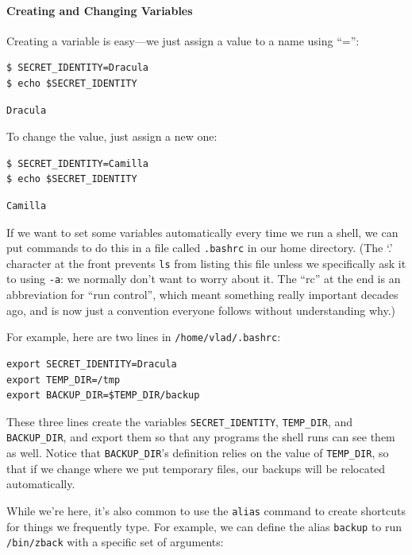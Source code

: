 \documentclass{book}
\begin{document}
\mbox{}\paragraph{Creating and Changing Variables}

Creating a variable is easy---we just assign a value to a name using
``='':

\begin{verbatim}
$ SECRET_IDENTITY=Dracula
$ echo $SECRET_IDENTITY
\end{verbatim}

\begin{verbatim}
Dracula
\end{verbatim}

To change the value, just assign a new one:

\begin{verbatim}
$ SECRET_IDENTITY=Camilla
$ echo $SECRET_IDENTITY
\end{verbatim}

\begin{verbatim}
Camilla
\end{verbatim}

If we want to set some variables automatically every time we run a
shell, we can put commands to do this in a file called \texttt{.bashrc}
in our home directory. (The `.' character at the front prevents
\texttt{ls} from listing this file unless we specifically ask it to
using \texttt{-a}: we normally don't want to worry about it. The ``rc''
at the end is an abbreviation for ``run control'', which meant something
really important decades ago, and is now just a convention everyone
follows without understanding why.)

For example, here are two lines in \texttt{/home/vlad/.bashrc}:

\begin{verbatim}
export SECRET_IDENTITY=Dracula
export TEMP_DIR=/tmp
export BACKUP_DIR=$TEMP_DIR/backup
\end{verbatim}

These three lines create the variables \texttt{SECRET\_IDENTITY},
\texttt{TEMP\_DIR}, and \texttt{BACKUP\_DIR}, and export them so that
any programs the shell runs can see them as well. Notice that
\texttt{BACKUP\_DIR}'s definition relies on the value of
\texttt{TEMP\_DIR}, so that if we change where we put temporary files,
our backups will be relocated automatically.

While we're here, it's also common to use the \texttt{alias} command to
create shortcuts for things we frequently type. For example, we can
define the alias \texttt{backup} to run \texttt{/bin/zback} with a
specific set of arguments:
\end{document}
